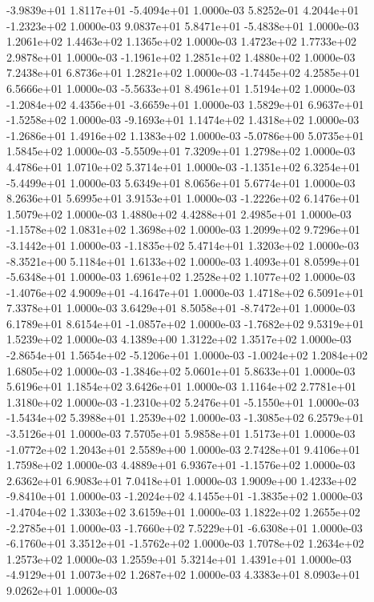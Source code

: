 -3.9839e+01  1.8117e+01 -5.4094e+01  1.0000e-03
 5.8252e-01  4.2044e+01 -1.2323e+02  1.0000e-03
 9.0837e+01  5.8471e+01 -5.4838e+01  1.0000e-03
1.2061e+02 1.4463e+02 1.1365e+02  1.0000e-03
1.4723e+02 1.7733e+02 2.9878e+01  1.0000e-03
-1.1961e+02  1.2851e+02  1.4880e+02  1.0000e-03
7.2438e+01 6.8736e+01 1.2821e+02  1.0000e-03
-1.7445e+02  4.2585e+01  6.5666e+01  1.0000e-03
-5.5633e+01  8.4961e+01  1.5194e+02  1.0000e-03
-1.2084e+02  4.4356e+01 -3.6659e+01  1.0000e-03
 1.5829e+01  6.9637e+01 -1.5258e+02  1.0000e-03
-9.1693e+01  1.1474e+02  1.4318e+02  1.0000e-03
-1.2686e+01  1.4916e+02  1.1383e+02  1.0000e-03
-5.0786e+00  5.0735e+01  1.5845e+02  1.0000e-03
-5.5509e+01  7.3209e+01  1.2798e+02  1.0000e-03
4.4786e+01 1.0710e+02 5.3714e+01  1.0000e-03
-1.1351e+02  6.3254e+01 -5.4499e+01  1.0000e-03
5.6349e+01 8.0656e+01 5.6774e+01  1.0000e-03
8.2636e+01 5.6995e+01 3.9153e+01  1.0000e-03
-1.2226e+02  6.1476e+01  1.5079e+02  1.0000e-03
1.4880e+02 4.4288e+01 2.4985e+01  1.0000e-03
-1.1578e+02  1.0831e+02  1.3698e+02  1.0000e-03
 1.2099e+02  9.7296e+01 -3.1442e+01  1.0000e-03
-1.1835e+02  5.4714e+01  1.3203e+02  1.0000e-03
-8.3521e+00  5.1184e+01  1.6133e+02  1.0000e-03
 1.4093e+01  8.0599e+01 -5.6348e+01  1.0000e-03
1.6961e+02 1.2528e+02 1.1077e+02  1.0000e-03
-1.4076e+02  4.9009e+01 -4.1647e+01  1.0000e-03
1.4718e+02 6.5091e+01 7.3378e+01  1.0000e-03
 3.6429e+01  8.5058e+01 -8.7472e+01  1.0000e-03
 6.1789e+01  8.6154e+01 -1.0857e+02  1.0000e-03
-1.7682e+02  9.5319e+01  1.5239e+02  1.0000e-03
4.1389e+00 1.3122e+02 1.3517e+02  1.0000e-03
-2.8654e+01  1.5654e+02 -5.1206e+01  1.0000e-03
-1.0024e+02  1.2084e+02  1.6805e+02  1.0000e-03
-1.3846e+02  5.0601e+01  5.8633e+01  1.0000e-03
5.6196e+01 1.1854e+02 3.6426e+01  1.0000e-03
1.1164e+02 2.7781e+01 1.3180e+02  1.0000e-03
-1.2310e+02  5.2476e+01 -5.1550e+01  1.0000e-03
-1.5434e+02  5.3988e+01  1.2539e+02  1.0000e-03
-1.3085e+02  6.2579e+01 -3.5126e+01  1.0000e-03
7.5705e+01 5.9858e+01 1.5173e+01  1.0000e-03
-1.0772e+02  1.2043e+01  2.5589e+00  1.0000e-03
2.7428e+01 9.4106e+01 1.7598e+02  1.0000e-03
 4.4889e+01  6.9367e+01 -1.1576e+02  1.0000e-03
2.6362e+01 6.9083e+01 7.0418e+01  1.0000e-03
 1.9009e+00  1.4233e+02 -9.8410e+01  1.0000e-03
-1.2024e+02  4.1455e+01 -1.3835e+02  1.0000e-03
-1.4704e+02  1.3303e+02  3.6159e+01  1.0000e-03
 1.1822e+02  1.2655e+02 -2.2785e+01  1.0000e-03
-1.7660e+02  7.5229e+01 -6.6308e+01  1.0000e-03
-6.1760e+01  3.3512e+01 -1.5762e+02  1.0000e-03
1.7078e+02 1.2634e+02 1.2573e+02  1.0000e-03
1.2559e+01 5.3214e+01 1.4391e+01  1.0000e-03
-4.9129e+01  1.0073e+02  1.2687e+02  1.0000e-03
4.3383e+01 8.0903e+01 9.0262e+01  1.0000e-03

